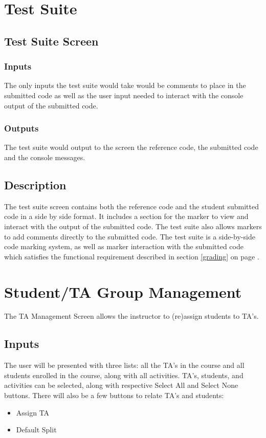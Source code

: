 \documentclass{article}
\begin{document}
\section{Test Suite}
\subsection{Test Suite Screen}
\subsubsection{Inputs}
The only inputs the test suite would take would be comments to place in the submitted code as well as the user input needed to interact with the console output of the submitted code.
\subsubsection{Outputs}
The test suite would output to the screen the reference code, the submitted code and the console messages.
\subsection{Description}
The test suite screen contains both the reference code and the student submitted code in a side by side format.  It includes a section for the marker to view and interact with the output of the submitted code.  The test suite also allows markers to add comments directly to the submitted code.  The test suite is a side-by-side code marking system, as well as marker interaction with the submitted code which satisfies the functional requirement described in section \ref{grading} on page \pageref{grading}.

\section{Student/TA Group Management}
The TA Management Screen allows the instructor to (re)assign students to TA's.
\subsection{Inputs}
The user will be presented with three lists: all the TA's in the course and all students enrolled in the course, along with all activities.  TA's, students, and activities can be selected, along with respective Select All and Select None buttons.  There will also be a few buttons to relate TA's and students:
\begin{itemize}
  \item Assign TA
  \item Default Split
\end{itemize}
\end{document}
